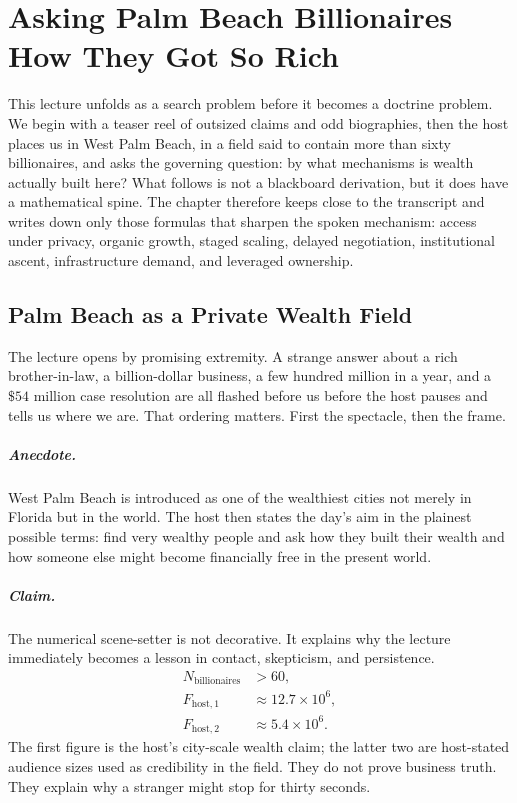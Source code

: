 \chapter{Asking Palm Beach Billionaires How They Got So Rich}

This lecture unfolds as a search problem before it becomes a doctrine problem. We begin with a teaser reel of outsized claims and odd biographies, then the host places us in West Palm Beach, in a field said to contain more than sixty billionaires, and asks the governing question: by what mechanisms is wealth actually built here? What follows is not a blackboard derivation, but it does have a mathematical spine. The chapter therefore keeps close to the transcript and writes down only those formulas that sharpen the spoken mechanism: access under privacy, organic growth, staged scaling, delayed negotiation, institutional ascent, infrastructure demand, and leveraged ownership.

\section{Palm Beach as a Private Wealth Field}

The lecture opens by promising extremity. A strange answer about a rich brother-in-law, a billion-dollar business, a few hundred million in a year, and a \(\$54\) million case resolution are all flashed before us before the host pauses and tells us where we are. That ordering matters. First the spectacle, then the frame.

\paragraph{Anecdote.} West Palm Beach is introduced as one of the wealthiest cities not merely in Florida but in the world. The host then states the day's aim in the plainest possible terms: find very wealthy people and ask how they built their wealth and how someone else might become financially free in the present world.

\paragraph{Claim.} The numerical scene-setter is not decorative. It explains why the lecture immediately becomes a lesson in contact, skepticism, and persistence.
\begin{align}
N_{\mathrm{billionaires}} &> 60,\\
F_{\mathrm{host},1} &\approx 12.7\times 10^6,\\
F_{\mathrm{host},2} &\approx 5.4\times 10^6.
\end{align}
The first figure is the host's city-scale wealth claim; the latter two are host-stated audience sizes used as credibility in the field. They do not prove business truth. They explain why a stranger might stop for thirty seconds.

